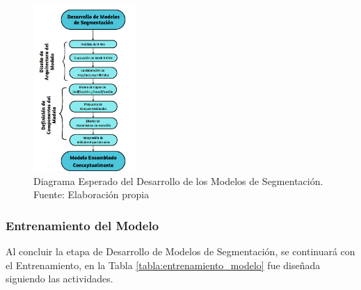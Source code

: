  
 \begin{figure}[h]
    \begin{center}
        \includegraphics[width=0.35\textwidth]{3/figures/Diagrama de desarrollo.png}
        \caption[Diagrama Esperado del Desarrollo de los Modelos de Segmentación]{Diagrama Esperado del Desarrollo de los Modelos de Segmentación.\\
        Fuente: Elaboración propia}
        \label{3:fig5}
    \end{center}
\end{figure}

\subsubsection{Entrenamiento del Modelo}
Al concluir la etapa de Desarrollo de Modelos de Segmentación, se continuará con el Entrenamiento, en la Tabla \ref{tabla:entrenamiento_modelo} fue diseñada siguiendo las actividades.

